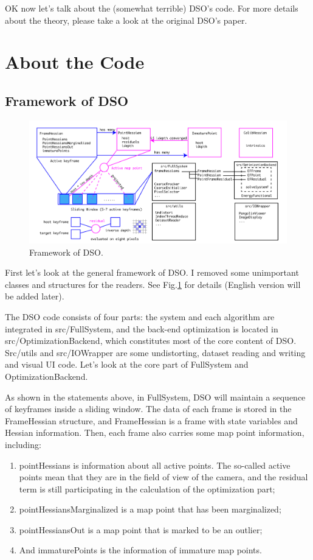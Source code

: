 \documentclass[a4paper,10pt]{article}
\begin{document}
	OK now let's talk about the (somewhat terrible) DSO's code. For more details about the theory, please take a look at the original DSO's paper.
	
	\section{About the Code}
	\subsection{Framework of DSO}
	\begin{figure}[htp]
	\centering
	\includegraphics[width=1.0\textwidth]{figs/framework-dso-en}
	\caption{Framework of DSO.}
	\label{fig:framework-dso}
	\end{figure}
	First let's look at the general framework of DSO. I removed some unimportant classes and structures for the readers. See Fig.\ref{fig:framework-dso} for details (English version will be added later).
	
	The DSO code consists of four parts: the system and each algorithm are integrated in src/FullSystem, and the back-end optimization is located in src/OptimizationBackend, which constitutes most of the core content of DSO. Src/utils and src/IOWrapper are some undistorting, dataset reading and writing and visual UI code. Let's look at the core part of FullSystem and OptimizationBackend.
	
	As shown in the statements above, in FullSystem, DSO will maintain a sequence of keyframes inside a sliding window. The data of each frame is stored in the FrameHessian structure, and FrameHessian is a frame with state variables and Hessian information. Then, each frame also carries some map point information, including:
	\begin{enumerate}
	\item pointHessians is information about all active points. The so-called active points mean that they are in the field of view of the camera, and the residual term is still participating in the calculation of the optimization part;
	\item pointHessiansMarginalized is a map point that has been marginalized;
	\item pointHessiansOut is a map point that is marked to be an outlier;
	\item And immaturePoints is the information of immature map points.
	\end{enumerate}
	
\end{document}

